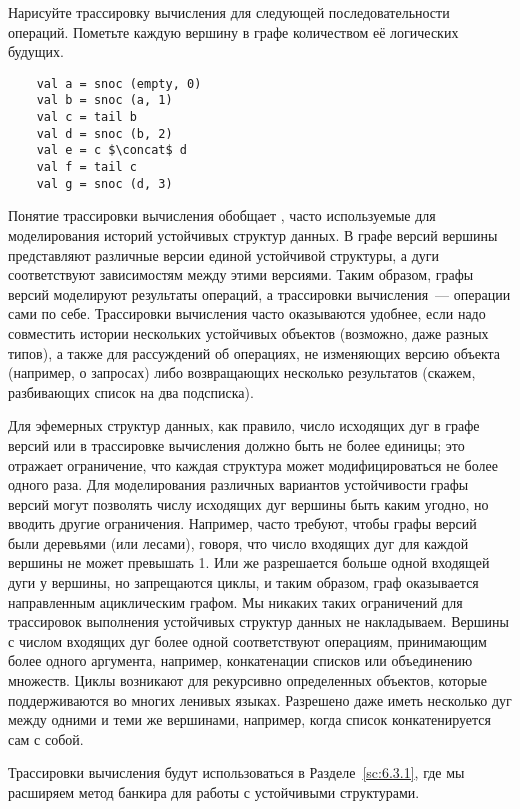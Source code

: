 \begin{exercise}\label{ex:6.1}
  Нарисуйте трассировку вычисления для следующей последовательности
  операций. Пометьте каждую вершину в графе количеством её логических
  будущих.
  \begin{lstlisting}
    val a = snoc (empty, 0)
    val b = snoc (a, 1)
    val c = tail b
    val d = snoc (b, 2)
    val e = c $\concat$ d
    val f = tail c
    val g = snoc (d, 3)
  \end{lstlisting}
\end{exercise}
Понятие трассировки вычисления обобщает  \cite{Driscoll-etal1989}, часто используемые для
моделирования историй устойчивых структур данных. В графе версий
вершины представляют различные версии единой устойчивой структуры, а
дуги соответствуют зависимостям между этими версиями.  Таким образом,
графы версий моделируют результаты операций, а трассировки
вычисления~--- операции сами по себе. Трассировки вычисления часто
оказываются удобнее, если надо совместить истории нескольких
устойчивых объектов (возможно, даже разных типов), а также для
рассуждений об операциях, не изменяющих версию объекта (например, о
запросах) либо возвращающих несколько результатов (скажем, разбивающих
список на два подсписка).

Для эфемерных структур данных, как правило, число исходящих дуг в
графе версий или в трассировке вычисления должно быть не более
единицы; это отражает ограничение, что каждая структура может
модифицироваться не более одного раза.  Для моделирования различных
вариантов устойчивости графы версий могут позволять числу исходящих
дуг вершины быть каким угодно, но вводить другие
ограничения. Например, часто требуют, чтобы графы версий были
деревьями (или лесами), говоря, что число входящих дуг для каждой
вершины не может превышать 1. Или же разрешается больше одной входящей
дуги у вершины, но запрещаются циклы, и таким образом, граф
оказывается направленным ациклическим графом. Мы никаких таких
ограничений для трассировок выполнения устойчивых структур данных не
накладываем. Вершины с числом входящих дуг более одной соответствуют
операциям, принимающим более одного аргумента, например, конкатенации
списков или объединению множеств. Циклы возникают для рекурсивно
определенных объектов, которые поддерживаются во многих ленивых
языках. Разрешено даже иметь несколько дуг между одними и теми же
вершинами, например, когда список конкатенируется сам с собой.

Трассировки вычисления будут использоваться в Разделе~\ref{sc:6.3.1},
где мы расширяем метод банкира для работы с устойчивыми структурами.

